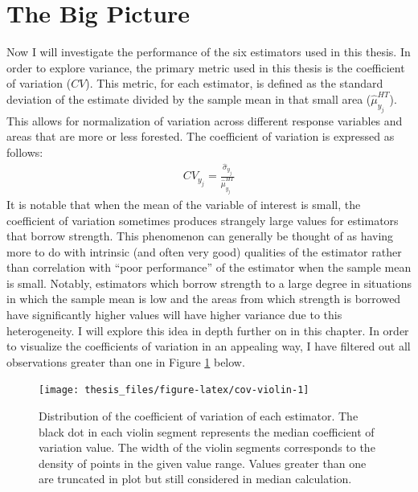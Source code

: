 \documentclass[12pt,twoside]{reedthesis}
\begin{document}
\hypertarget{the-big-picture}{%
\section{The Big Picture}\label{the-big-picture}}

Now I will investigate the performance of the six estimators used in this thesis. In order to explore variance, the primary metric used in this thesis is the coefficient of variation (\(CV\)). This metric, for each estimator, is defined as the standard deviation of the estimate divided by the sample mean in that small area (\(\hat \mu_{y_j}^{HT}\)). This allows for normalization of variation across different response variables and areas that are more or less forested. The coefficient of variation is expressed as follows:
\begin{align}
CV_{y_j} = \frac{\hat\sigma_{y_j}}{\hat\mu_{y_j}^{HT}}
\end{align}
It is notable that when the mean of the variable of interest is small, the coefficient of variation sometimes produces strangely large values for estimators that borrow strength. This phenomenon can generally be thought of as having more to do with intrinsic (and often very good) qualities of the estimator rather than correlation with ``poor performance'' of the estimator when the sample mean is small. Notably, estimators which borrow strength to a large degree in situations in which the sample mean is low and the areas from which strength is borrowed have significantly higher values will have higher variance due to this heterogeneity. I will explore this idea in depth further on in this chapter.
\clearpage
In order to visualize the coefficients of variation in an appealing way, I have filtered out all observations greater than one in Figure \ref{fig:cov-violin} below.
\begin{figure}

{\centering \texttt{[image: thesis\_files/figure-latex/cov-violin-1]} 

}

\caption[Distribution of the coefficient of variation of each estimator]{Distribution of the coefficient of variation of each estimator. The black dot in each violin segment represents the median coefficient of variation value. The width of the violin segments corresponds to the density of points in the given value range. Values greater than one are truncated in plot but still considered in median calculation.}\label{fig:cov-violin}
\end{figure}
\end{document}
